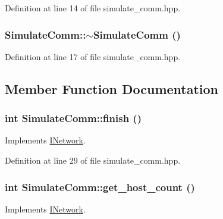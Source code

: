 Definition at line 14 of file simulate\_\-comm.hpp.\hypertarget{class_simulate_comm_aa74089e430618f2d94bb47abe644c5d5}{
\subsubsection[{$\sim$SimulateComm}]{\setlength{\rightskip}{0pt plus 5cm}SimulateComm::$\sim$SimulateComm ()}}
\label{class_simulate_comm_aa74089e430618f2d94bb47abe644c5d5}


Definition at line 17 of file simulate\_\-comm.hpp.

\subsection{Member Function Documentation}
\hypertarget{class_simulate_comm_aab86214be629c432b2fd0922afa6ba6c}{
\subsubsection[{finish}]{\setlength{\rightskip}{0pt plus 5cm}int SimulateComm::finish ()}}
\label{class_simulate_comm_aab86214be629c432b2fd0922afa6ba6c}


Implements \hyperlink{class_i_network_a667e56ba7f3713c949f84573ae710a85}{INetwork}.

Definition at line 29 of file simulate\_\-comm.hpp.\hypertarget{class_simulate_comm_abce134f416c691a6910fcf6601ee8829}{
\subsubsection[{get\_\-host\_\-count}]{\setlength{\rightskip}{0pt plus 5cm}int SimulateComm::get\_\-host\_\-count ()}}
\label{class_simulate_comm_abce134f416c691a6910fcf6601ee8829}


Implements \hyperlink{class_i_network_a24bd475422706998cbee500825728d55}{INetwork}.

